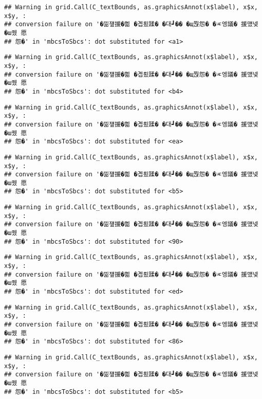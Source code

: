 \documentclass[
]{article}
\begin{document}
\begin{verbatim}
## Warning in grid.Call(C_textBounds, as.graphicsAnnot(x$label), x$x, x$y, :
## conversion failure on '�낆쟾援�쁾 �곕룄蹂� �대┛�� �щ쭩怨� �ㅼ엥議� 援먰넻�ш퀬 愿
## 怨�' in 'mbcsToSbcs': dot substituted for <a1>
\end{verbatim}

\begin{verbatim}
## Warning in grid.Call(C_textBounds, as.graphicsAnnot(x$label), x$x, x$y, :
## conversion failure on '�낆쟾援�쁾 �곕룄蹂� �대┛�� �щ쭩怨� �ㅼ엥議� 援먰넻�ш퀬 愿
## 怨�' in 'mbcsToSbcs': dot substituted for <b4>
\end{verbatim}

\begin{verbatim}
## Warning in grid.Call(C_textBounds, as.graphicsAnnot(x$label), x$x, x$y, :
## conversion failure on '�낆쟾援�쁾 �곕룄蹂� �대┛�� �щ쭩怨� �ㅼ엥議� 援먰넻�ш퀬 愿
## 怨�' in 'mbcsToSbcs': dot substituted for <ea>
\end{verbatim}

\begin{verbatim}
## Warning in grid.Call(C_textBounds, as.graphicsAnnot(x$label), x$x, x$y, :
## conversion failure on '�낆쟾援�쁾 �곕룄蹂� �대┛�� �щ쭩怨� �ㅼ엥議� 援먰넻�ш퀬 愿
## 怨�' in 'mbcsToSbcs': dot substituted for <b5>
\end{verbatim}

\begin{verbatim}
## Warning in grid.Call(C_textBounds, as.graphicsAnnot(x$label), x$x, x$y, :
## conversion failure on '�낆쟾援�쁾 �곕룄蹂� �대┛�� �щ쭩怨� �ㅼ엥議� 援먰넻�ш퀬 愿
## 怨�' in 'mbcsToSbcs': dot substituted for <90>
\end{verbatim}

\begin{verbatim}
## Warning in grid.Call(C_textBounds, as.graphicsAnnot(x$label), x$x, x$y, :
## conversion failure on '�낆쟾援�쁾 �곕룄蹂� �대┛�� �щ쭩怨� �ㅼ엥議� 援먰넻�ш퀬 愿
## 怨�' in 'mbcsToSbcs': dot substituted for <ed>
\end{verbatim}

\begin{verbatim}
## Warning in grid.Call(C_textBounds, as.graphicsAnnot(x$label), x$x, x$y, :
## conversion failure on '�낆쟾援�쁾 �곕룄蹂� �대┛�� �щ쭩怨� �ㅼ엥議� 援먰넻�ш퀬 愿
## 怨�' in 'mbcsToSbcs': dot substituted for <86>
\end{verbatim}

\begin{verbatim}
## Warning in grid.Call(C_textBounds, as.graphicsAnnot(x$label), x$x, x$y, :
## conversion failure on '�낆쟾援�쁾 �곕룄蹂� �대┛�� �щ쭩怨� �ㅼ엥議� 援먰넻�ш퀬 愿
## 怨�' in 'mbcsToSbcs': dot substituted for <b5>
\end{verbatim}
\end{document}
